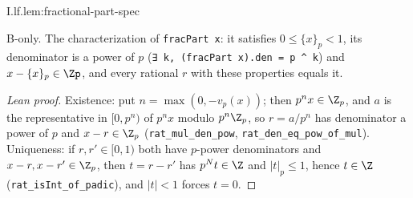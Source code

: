 \begin{lemma}
\bonly
{}
\end{lemma}
\begin{tfformal}{I.lf.lem:fractional-part-spec}
\begin{tffidelity}
B-only. The characterization of \texttt{fracPart x}: it satisfies $0\le\{x\}_p<1$, its denominator is a power of $p$ (\texttt{∃ k, (fracPart x).den = p \^{} k}) and $x-\{x\}_p\in\Zp$, and every rational $r$ with these properties equals it.
\end{tffidelity}
\end{tfformal}
\begin{proof}[Lean proof]
Existence: put $n=\max(0,-v_p(x))$; then $p^nx\in\Z_p$, and $a$ is the representative in $[0,p^n)$ of $p^nx$ modulo $p^n\Z_p$, so $r=a/p^n$ has denominator a power of $p$ and $x-r\in\Z_p$ (\texttt{rat\_mul\_den\_pow}, \texttt{rat\_den\_eq\_pow\_of\_mul}). Uniqueness: if $r,r'\in[0,1)$ both have $p$-power denominators and $x-r,x-r'\in\Z_p$, then $t=r-r'$ has $p^Nt\in\Z$ and $|t|_p\le1$, hence $t\in\Z$ (\texttt{rat\_isInt\_of\_padic}), and $|t|<1$ forces $t=0$.
\end{proof}

